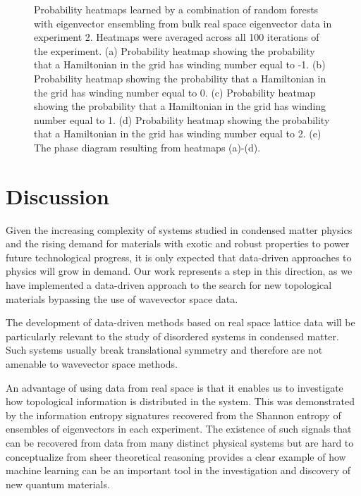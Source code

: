 \documentclass[fleqn,10pt]{wlscirep}
\begin{document}
\begin{figure}
\caption{Probability heatmaps learned by a combination of random forests with eigenvector ensembling from bulk real space eigenvector data in experiment 2. Heatmaps were averaged across all 100 iterations of the experiment. (a) Probability heatmap showing the probability that a Hamiltonian in the grid has winding number equal to -1.  (b) Probability heatmap showing the probability that a Hamiltonian in the grid has winding number equal to 0. (c) Probability heatmap showing the probability that a Hamiltonian in the grid has winding number equal to 1. (d) Probability heatmap showing the probability that a Hamiltonian in the grid has winding number equal to 2. (e) The phase diagram resulting from heatmaps (a)-(d).}
\label{ssh2_heatmaps}
\end{figure}

\section*{Discussion}

Given the increasing complexity of systems studied in condensed matter physics and the rising demand for materials with exotic and robust properties to power future technological progress, it is only expected that data-driven approaches to physics will grow in demand. Our work represents a step in this direction, as we have implemented a data-driven approach to the search for new topological materials bypassing the use of wavevector space data.

The development of data-driven methods based on real space lattice data will be particularly relevant to the study of disordered systems in condensed matter. Such systems usually break translational symmetry and therefore are not amenable to wavevector space methods.

An advantage of using data from real space is that it enables us to investigate how topological information is distributed in the system. This was demonstrated by the information entropy signatures recovered from the Shannon entropy of ensembles of eigenvectors in each experiment. The existence of such signals that can be recovered from data from many distinct physical systems but are hard to conceptualize from sheer theoretical reasoning provides a clear example of how machine learning can be an important tool in the investigation and discovery of new quantum materials.
\end{document}
